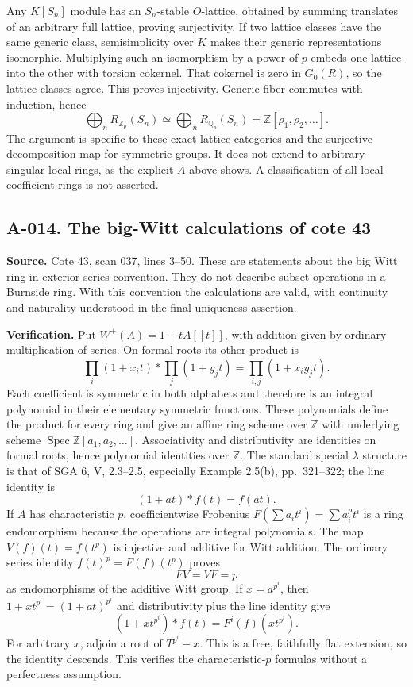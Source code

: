 Any $K[S_n]$ module has an $S_n$-stable $O$-lattice, obtained by
summing translates of an arbitrary full lattice, proving surjectivity.
If two lattice classes have the same generic class, semisimplicity
over $K$ makes their generic representations isomorphic. Multiplying
such an isomorphism by a power of $p$ embeds one lattice into the
other with torsion cokernel. That cokernel is zero in $G_0(R)$, so
the lattice classes agree. This proves injectivity. Generic fiber
commutes with induction, hence
\[
 \bigoplus_n R_{\mathbb Z_p}(S_n)\simeq
 \bigoplus_n R_{\mathbb Q_p}(S_n)=\mathbb Z[\rho_1,\rho_2,\ldots].
\]
The argument is specific to these exact lattice categories and the
surjective decomposition map for symmetric groups. It does not extend
to arbitrary singular local rings, as the explicit $A$ above shows.
A classification of all local coefficient rings is not asserted.


\subsection*{A-014. The big-Witt calculations of cote 43}
\textbf{Source.} Cote 43, scan 037, lines 3--50. These are statements
about the big Witt ring in exterior-series convention. They do not
describe subset operations in a Burnside ring. With this convention
the calculations are valid, with continuity and naturality understood
in the final uniqueness assertion.

\textbf{Verification.} Put $W^+(A)=1+tA[[t]]$, with addition given
by ordinary multiplication of series. On formal roots its other
product is
\[
 \prod_i(1+x_it)*\prod_j(1+y_jt)=\prod_{i,j}(1+x_iy_jt).
\]
Each coefficient is symmetric in both alphabets and therefore is
an integral polynomial in their elementary symmetric functions.
These polynomials define the product for every ring and give an
affine ring scheme over $\mathbb Z$ with underlying scheme
$\operatorname{Spec}\mathbb Z[a_1,a_2,\ldots]$. Associativity and
distributivity are identities on formal roots, hence polynomial
identities over $\mathbb Z$. The standard special $\lambda$
structure is that of SGA 6, V, 2.3--2.5, especially Example 2.5(b), pp.~321--322; the line identity is
\[
 (1+at)*f(t)=f(at).
\]
If $A$ has characteristic $p$, coefficientwise Frobenius
$F(\sum a_it^i)=\sum a_i^pt^i$ is a ring endomorphism because
the operations are integral polynomials. The map $V(f)(t)=f(t^p)$
is injective and additive for Witt addition. The ordinary series
identity $f(t)^p=F(f)(t^p)$ proves
\[
 FV=VF=p
\]
as endomorphisms of the additive Witt group. If $x=a^{p^i}$, then
$1+xt^{p^i}=(1+at)^{p^i}$ and distributivity plus the line identity
give
\[
 (1+xt^{p^i})*f(t)=F^i(f)(xt^{p^i}).
\]
For arbitrary $x$, adjoin a root of $T^{p^i}-x$. This is a free,
faithfully flat extension, so the identity descends. This verifies
the characteristic-$p$ formulas without a perfectness assumption.

